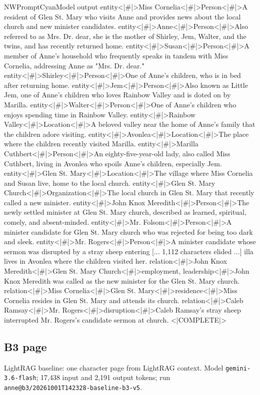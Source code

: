 \begin{nwprompt}{NWPromptCyan}{Model output}
entity<|#|>Miss Cornelia<|#|>Person<|#|>A resident of Glen St. Mary who visits Anne and provides news about the local church and new minister candidates.
entity<|#|>Anne<|#|>Person<|#|>Also referred to as Mrs. Dr. dear, she is the mother of Shirley, Jem, Walter, and the twins, and has recently returned home.
entity<|#|>Susan<|#|>Person<|#|>A member of Anne's household who frequently speaks in tandem with Miss Cornelia, addressing Anne as "Mrs. Dr. dear."
entity<|#|>Shirley<|#|>Person<|#|>One of Anne's children, who is in bed after returning home.
entity<|#|>Jem<|#|>Person<|#|>Also known as Little Jem, one of Anne's children who loves Rainbow Valley and is doted on by Marilla.
entity<|#|>Walter<|#|>Person<|#|>One of Anne's children who enjoys spending time in Rainbow Valley.
entity<|#|>Rainbow Valley<|#|>Location<|#|>A beloved valley near the home of Anne's family that the children adore visiting.
entity<|#|>Avonlea<|#|>Location<|#|>The place where the children recently visited Marilla.
entity<|#|>Marilla Cuthbert<|#|>Person<|#|>An eighty-five-year-old lady, also called Miss Cuthbert, living in Avonlea who spoils Anne's children, especially Jem.
entity<|#|>Glen St. Mary<|#|>Location<|#|>The village where Miss Cornelia and Susan live, home to the local church.
entity<|#|>Glen St. Mary Church<|#|>Organization<|#|>The local church in Glen St. Mary that recently called a new minister.
entity<|#|>John Knox Meredith<|#|>Person<|#|>The newly settled minister at Glen St. Mary church, described as learned, spiritual, comely, and absent-minded.
entity<|#|>Mr. Folsom<|#|>Person<|#|>A minister candidate for Glen St. Mary church who was rejected for being too dark and sleek.
entity<|#|>Mr. Rogers<|#|>Person<|#|>A minister candidate whose sermon was disrupted by a stray sheep entering
[... 1,112 characters elided ...]
illa lives in Avonlea where the children visited her.
relation<|#|>John Knox Meredith<|#|>Glen St. Mary Church<|#|>employment, leadership<|#|>John Knox Meredith was called as the new minister for the Glen St. Mary church.
relation<|#|>Miss Cornelia<|#|>Glen St. Mary<|#|>residence<|#|>Miss Cornelia resides in Glen St. Mary and attends its church.
relation<|#|>Caleb Ramsay<|#|>Mr. Rogers<|#|>disruption<|#|>Caleb Ramsay's stray sheep interrupted Mr. Rogers's candidate sermon at church.
<|COMPLETE|>
\end{nwprompt}

\subsection*{B3 page}
LightRAG baseline: one character page from LightRAG context. Model \texttt{gemini-3.6-flash}; 17,438 input and 2,191 output tokens; run \nolinkurl{anne@b3/20261001T142328-baseline-b3-v5}.

